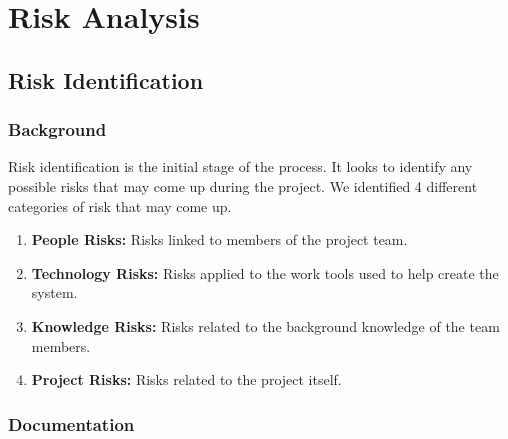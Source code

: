 \documentclass[11pt, a4paper]{report}
\begin{document}
\chapter{Risk Analysis}

\pagebreak

\section{Risk Identification} \label{sec:riskID}
\subsection{Background}
Risk identification is the initial stage of the process. It looks to identify any possible risks that may come up during the project. We identified 4 different categories of risk that may come up.

\begin{enumerate}
	\item 
	{\bfseries People Risks: } Risks linked to members of the project team.
	\item 
	{\bfseries Technology Risks: } Risks applied to the work tools used to help create the system.
	\item 
	{\bfseries Knowledge Risks: } Risks related to the background knowledge of the team members.
	\item 
	{\bfseries Project Risks: } Risks related to the project itself.
	
\end{enumerate}

\subsection{Documentation}
\end{document}
